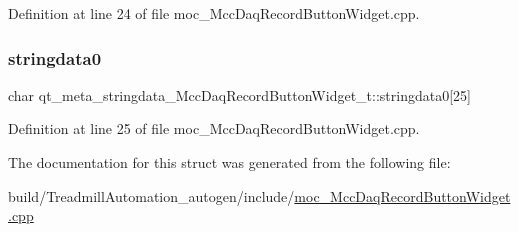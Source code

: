 Definition at line 24 of file moc\+\_\+\+Mcc\+Daq\+Record\+Button\+Widget.\+cpp.

\mbox{\label{structqt__meta__stringdata___mcc_daq_record_button_widget__t_a78b094f20a4791719fec140e3f6b4a50}} 
\subsubsection{\texorpdfstring{stringdata0}{stringdata0}}
{\footnotesize\ttfamily char qt\+\_\+meta\+\_\+stringdata\+\_\+\+Mcc\+Daq\+Record\+Button\+Widget\+\_\+t\+::stringdata0\mbox{[}25\mbox{]}}



Definition at line 25 of file moc\+\_\+\+Mcc\+Daq\+Record\+Button\+Widget.\+cpp.



The documentation for this struct was generated from the following file\+:\begin{DoxyCompactItemize}
\item 
build/\+Treadmill\+Automation\+\_\+autogen/include/\hyperlink{moc___mcc_daq_record_button_widget_8cpp}{moc\+\_\+\+Mcc\+Daq\+Record\+Button\+Widget.\+cpp}\end{DoxyCompactItemize}
